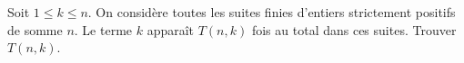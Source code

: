 Soit $1 \leq k \leq n$. On considère toutes les suites finies d'entiers strictement positifs de somme $n$. Le terme $k$ apparaît $T(n, k)$ fois au total dans ces suites. Trouver $T(n, k)$.
